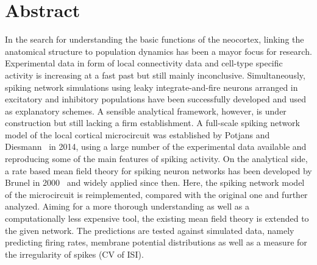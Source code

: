 \section{Abstract}
\label{abstract}
In the search for understanding the basic functions of the neocortex, 
linking the anatomical structure to population dynamics has been a mayor
focus for research. Experimental data in form of local connectivity data
and cell-type specific activity is increasing at a fast past but still 
mainly inconclusive. Simultaneously, spiking network simulations using 
leaky integrate-and-fire neurons arranged in excitatory and inhibitory 
populations have been successfully developed and used as 
explanatory schemes. A sensible analytical framework, however, 
 is under construction but still lacking a firm establishment. 
A full-scale spiking network model of the local cortical microcircuit
was established by Potjans and Diesmann~\cite{potjans2014} in 2014, 
using a large number of the experimental data available and reproducing
some of the main features of spiking activity. 
On the analytical side, a rate based mean field theory for spiking neuron
networks has been developed by Brunel in 2000~\cite{brunel2000} 
and widely applied since then. 
Here, the spiking network model of the microcircuit is reimplemented, 
compared with the original one and further analyzed.
Aiming for a more thorough understanding as well as a computationally less
expensive tool, the existing mean field theory is extended to the given network. 
The predictions are tested against simulated data, namely predicting 
firing rates, membrane potential distributions as well as a measure 
for the irregularity of spikes (CV of ISI). 

